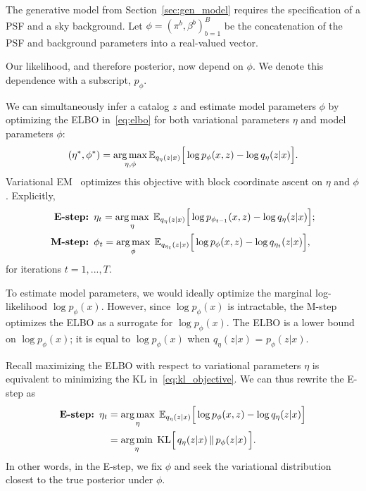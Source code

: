 The generative model from Section~\ref{sec:gen_model} requires
the specification of a PSF and a sky background. Let $\phi = (\pi^b, \beta^b)_{b = 1}^B$ be the concatenation of the PSF and background parameters into a real-valued vector. 

Our likelihood, and therefore posterior, now depend on $\phi$. We denote this dependence with a subscript, $p_\phi$. 

We can simultaneously infer a catalog $z$ and 
estimate model parameters $\phi$ by optimizing 
the ELBO in~\eqref{eq:elbo} for both variational parameters $\eta$ and model parameters $\phi$: 
\begin{align}
(\eta^*, \phi^*) = \operatorname*{arg\,max}_{\eta, \phi} \mathbb{E}_{q_\eta(z | x)}\Big[\log p_\phi(x, z) - \log q_\eta(z | x)\Big].
\label{eq:em_obj}
\end{align}
Variational EM~\cite{Jordan_intro_vi, neal2000varem, Beal2002varem} optimizes this objective with block coordinate ascent on $\eta$ and $\phi$. Explicitly, 
\begin{align}
    \text{{\bf E-step: }} & 
    \eta_{t} = \operatorname*{arg\,max}_{\eta}\; \mathbb{E}_{q_\eta(z | x)}\Big[\log p_{\phi_{t-1}}(x, z) - \log q_\eta(z | x)\Big]; 
    \label{eq:e_step}
    \\
    \text{{\bf M-step: }} & \phi_{t} = \operatorname*{arg\,max}_{\phi}\; \mathbb{E}_{q_{\eta_t}(z | x)}\Big[\log p_{\phi}(x, z) - \log q_{\eta_t}(z | x)\Big],
    \label{eq:m_step}
\end{align}
for iterations $t = 1, ..., T$. 

To estimate model parameters, we would ideally optimize the marginal log-likelihood $\log p_\phi(x)$. However, since $\log p_\phi(x)$ is intractable, the M-step optimizes the ELBO as a surrogate for $\log p_\phi(x)$. The ELBO is a lower bound on 
$\log p_\phi(x)$; it is equal to $\log p_\phi(x)$ when $q_\eta(z | x)$ 
= $p_\phi(z | x)$. 

Recall maximizing the ELBO with respect to variational parameters $\eta$ 
is equivalent to minimizing the KL in~\eqref{eq:kl_objective}.
We can thus rewrite the E-step as 
\begin{align}
    \text{{\bf E-step: }} \eta_{t} &= \operatorname*{arg\,max}_{\eta}\; \mathbb{E}_{q_\eta(z | x)}\Big[\log p_{\phi}(x, z) - \log q_\eta(z | x)\Big]  \label{eq:e_step_kl1} \\
    &= \operatorname*{arg\,min}_{\eta} \; \mathrm{KL}\Big[\,q_\eta(z | x)\, \| \,p_\phi(z | x )\,\Big].  \label{eq:e_step_kl2}
\end{align} 
In other words, in the E-step, we fix $\phi$ and seek the variational distribution closest to the true posterior under $\phi$. 


